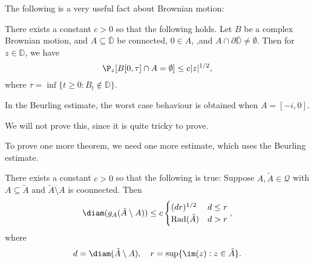 \documentclass[a4paper]{article}
\renewcommand\D{\mathbb{D}}
\newcommand\rad{\mathrm{Rad}}
\begin{document}
The following is a very useful fact about Brownian motion:
\begin{thm}
  There exists a constant $c > 0$ so that the following holds. Let $B$ be a complex Brownian motion, and $A \subseteq \bar{\D}$ be connected, $0 \in A$, ,and $A \cap \partial \bar{\D} \not= \emptyset$. Then for $z \in \D$, we have
  \[
    \P_z[B[0, \tau] \cap A = \emptyset] \leq c |z|^{1/2},
  \]
  where $\tau = \inf \{t \geq 0: B_t \not \in \D\}$.
\end{thm}
In the Beurling estimate, the worst case behaviour is obtained when $A = [-i, 0]$.

We will not prove this, since it is quite tricky to prove.

To prove one more theorem, we need one more estimate, which uses the Beurling estimate.

\begin{prop}
  There exists a constant $c > 0$ so that the following is true: Suppose $A, \tilde{A} \in \mathcal{Q}$ with $A \subseteq \tilde{A}$ and $\tilde{A} \setminus A$ is coonnected. Then
  \[
    \diam(g_A(\tilde{A}\setminus A))\leq c
    \begin{cases}
      (dr)^{1/2} & d \leq r\\
      \rad(\tilde{A}) & d > r
    \end{cases},
  \]
  where
  \[
    d = \diam(\tilde{A} \setminus A),\quad r = \sup \{\im (z) : z \in \tilde{A}\}.
  \]
\end{prop}
\end{document}
